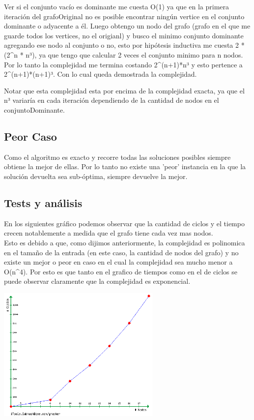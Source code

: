 Ver si el conjunto vacío es dominante me cuesta O(1) ya que en la primera iteración del grafoOriginal no es posible encontrar ningún vertice en el conjunto dominante o adyacente a él. Luego obtengo un nodo del grafo (grafo en el que me guarde todos los vertices, no el origianl) y busco el minimo conjunto dominante agregando ese nodo al conjunto o no, esto por hipótesis inductiva me cuesta 2 * (2^n * n³), ya que tengo que calcular 2 veces el conjunto minimo para n nodos. Por lo tanto la complejidad me termina costando  2^(n+1)*n³ y esto pertence a 2^(n+1)*(n+1)³. Con lo cual queda demostrada la complejidad.

Notar que esta complejidad esta por encima de la complejidad exacta, ya que el n³ variaría en cada iteración dependiendo de la cantidad de nodos en el conjuntoDominante.


\subsection{Peor Caso}

Como el algoritmo es exacto y recorre todas las soluciones posibles siempre obtiene la mejor de ellas. Por lo tanto no existe una 'peor' instancia
en la que la solución devuelta sea sub-óptima, siempre devuelve la mejor.

\subsection{Tests y análisis}

En los siguientes gráfico podemos observar que la cantidad de ciclos y el tiempo crecen notablemente a medida que el grafo tiene cada vez mas nodos.\\
Esto es debido a que, como dijimos anteriormente, la complejidad es polinomica en el tamaño de la entrada (en este caso, la cantidad de nodos 
del grafo) y no existe un mejor o peor en caso en el cual la complejidad sea mucho menor a O(n^4). Por esto es que tanto en el grafico de tiempos
 como en el de ciclos se puede observar claramente que la complejidad es exponencial.

\begin {center}
\includegraphics[width=8cm]{./graficos/goloso_1.png}
\end {center} 

